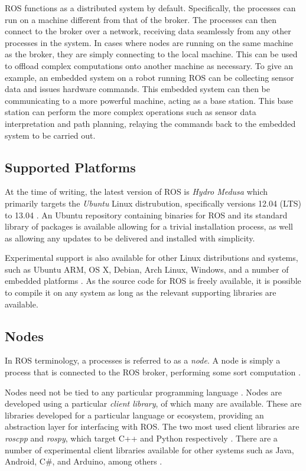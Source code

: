 ROS functions as a distributed system by default. Specifically, the processes can run on a machine different from that of the broker. The processes can then connect to the broker over a network, receiving data seamlessly from any other processes in the system. In cases where nodes are running on the same machine as the broker, they are simply connecting to the local machine. This can be used to offload complex computations onto another machine as necessary. To give an example, an embedded system on a robot running ROS can be collecting sensor data and issues hardware commands. This embedded system can then be communicating to a more powerful machine, acting as a base station. This base station can perform the more complex operations such as sensor data interpretation and path planning, relaying the commands back to the embedded system to be carried out.

\subsection{Supported Platforms}
At the time of writing, the latest version of ROS is \emph{Hydro Medusa} which primarily targets the \emph{Ubuntu} Linux distrubution, specifically versions 12.04 (LTS) to 13.04 \cite{ros_wiki_installation, ros_wiki_installation_ubuntu}. An Ubuntu repository containing binaries for ROS and its standard library of packages is available allowing for a trivial installation process, as well as allowing any updates to be delivered and installed with simplicity.

Experimental support is also available for other Linux distributions and systems, such as Ubuntu ARM, OS X, Debian, Arch Linux, Windows, and a number of embedded platforms \cite{ros_wiki_installation}. As the source code for ROS is freely available, it is possible to compile it on any system as long as the relevant supporting libraries are available.

\subsection{Nodes}
In ROS terminology, a processes is referred to as a \emph{node}. A node is simply a process that is connected to the ROS broker, performing some sort computation \cite{ros_paper}.

Nodes need not be tied to any particular programming language \cite{ros_paper}. Nodes are developed using a particular \emph{client library}, of which many are available. These are libraries developed for a particular language or ecosystem, providing an abstraction layer for interfacing with ROS. The two most used client libraries are \emph{roscpp} and \emph{rospy}, which target C++ and Python respectively \cite{ros_wiki_clientlibraries}. There are a number of experimental client libraries available for other systems such as Java, Android, C\#, and Arduino, among others \cite{ros_wiki_clientlibraries}.

